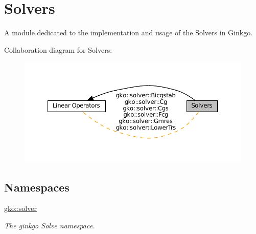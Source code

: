 \hypertarget{group__solvers}{}\section{Solvers}
\label{group__solvers}


A module dedicated to the implementation and usage of the Solvers in Ginkgo.  


Collaboration diagram for Solvers\+:
\nopagebreak
\begin{figure}[H]
\begin{center}
\leavevmode
\includegraphics[width=350pt]{group__solvers}
\end{center}
\end{figure}
\subsection*{Namespaces}
\begin{DoxyCompactItemize}
\item 
 \hyperlink{namespacegko_1_1solver}{gko\+::solver}
\begin{DoxyCompactList}\small\item\em The ginkgo Solve namespace. \end{DoxyCompactList}\end{DoxyCompactItemize}
